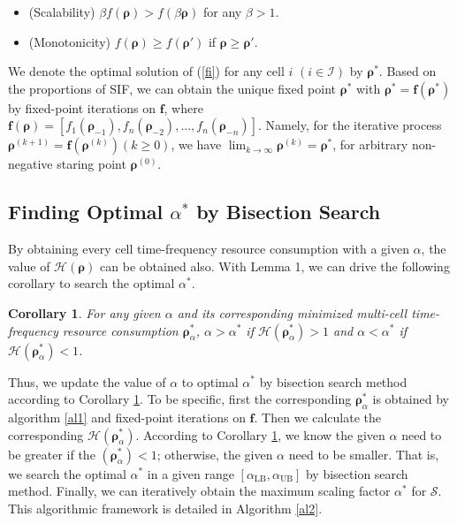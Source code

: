 \documentclass[10pt,journal,final,finalsubmission,twocolumn]{IEEEtran}
\newtheorem{corollary}[theorem]{Corollary}
\begin{document}
\begin{itemize}

\item (Scalability) $\beta f\left(\boldsymbol{\rho}\right)> f\left(\beta\boldsymbol{\rho}\right)$ for any $\beta>1$.

\item (Monotonicity) $f\left(\boldsymbol{\rho}\right) \geq f\left(\boldsymbol{\rho}'\right)$ if $\boldsymbol{\rho} \geq \boldsymbol{\rho}'$.

\end{itemize}

We denote the optimal solution of (\ref{fi}) for any cell $i$ $(i\in \mathcal{I})$ by $\boldsymbol{\rho}^* $. Based on the proportions of SIF, we can obtain the unique fixed point $\boldsymbol{\rho}^*$ with 
$\boldsymbol{\rho}^* = \boldsymbol{f}\left(\boldsymbol{\rho}^*\right)$ by fixed-point iterations on $\boldsymbol{f}$, where $\boldsymbol{f}\left(\boldsymbol{\rho}\right) = \left[ f_1\left(\boldsymbol{\rho}_{-1}\right), f_n\left(\boldsymbol{\rho}_{-2}\right), ..., f_n\left(\boldsymbol{\rho}_{-n}\right)\right]$. Namely, for the iterative process $\boldsymbol{\rho}^{(k+1)} =\boldsymbol{f}\left(\boldsymbol{\rho}^{(k)}\right) (k\geq0)$, we have $\lim_{k\rightarrow \infty }\boldsymbol{\rho}^{(k)}=\boldsymbol{\rho}^*$, for arbitrary non-negative staring point $\boldsymbol{\rho}^{(0)}$.

\subsection{Finding Optimal $\alpha^*$ by Bisection Search }\label{bisection}

 By obtaining every cell time-frequency resource consumption with a given $\alpha$, the value of $\mathcal{H}(\boldsymbol{\rho})$ can be obtained also. With Lemma 1, we can drive the following corollary to search the optimal $\alpha^*$.

\begin{corollary}\label{canbisection}
For any given $\alpha $ and its corresponding minimized multi-cell time-frequency resource consumption $ \boldsymbol{\rho}^*_\alpha$, $\alpha > \alpha^* $ if $\mathcal{H}(\boldsymbol{\rho}^*_\alpha) > 1$ and $\alpha < \alpha^* $ if $\mathcal{H}(\boldsymbol{\rho}^*_\alpha) < 1$. 
\end{corollary}

Thus, we update the value of $\alpha$ to optimal $\alpha^*$ by bisection search method according to Corollary \ref{canbisection}. To be specific, first the corresponding $\boldsymbol{\rho}^*_\alpha$ is obtained by algorithm \ref{al1} and fixed-point iterations on $\boldsymbol{f}$. Then we calculate the corresponding $\mathcal{H}(\boldsymbol{\rho}^*_\alpha)$. According to Corollary \ref{canbisection}, we know the given $\alpha $ need to be greater if the $(\boldsymbol{\rho}^*_\alpha)<1$; otherwise, the given $\alpha $ need to be smaller. That is, we search the optimal $\alpha ^*$ in a given range $[\alpha _\text{LB},\alpha _\text{UB} ]$ by bisection search method. Finally, we can iteratively obtain the maximum scaling factor $\alpha^*$ for $\mathcal{S}$. This algorithmic framework is detailed in Algorithm \ref{al2}. 
\end{document}

